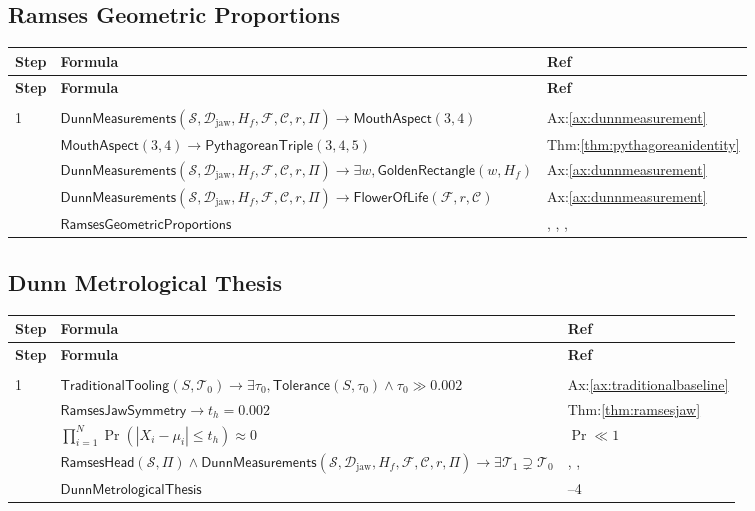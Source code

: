 \documentclass[12pt]{amsart}
\newcommand{\br}{,\allowbreak}
\newenvironment{prooftable}{%
	\renewcommand{\arraystretch}{1.2}%
	\setlength{\tabcolsep}{4pt}%
	\setlength{\arrayrulewidth}{0.05pt}
	\tiny
	\sloppy
	\begin{longtable}{
			|>{\centering\arraybackslash}m{0.7cm}|
			>{\raggedright\centering\arraybackslash}m{0.70\textwidth}|
			>{\centering\arraybackslash}m{3.5cm}|  %
		}%
		\hline
		\textbf{Step} & \centering\textbf{Formula} & \textbf{Ref} \\
		\hline
		\endfirsthead
		\hline
		\textbf{Step} & \centering\textbf{Formula} & \textbf{Ref} \\
		\hline
		\endhead
		\hline
		\multicolumn{3}{r}{\textit{Continued on next page}} \\
		\endfoot
		\hline
		\endlastfoot
	}{%
	\end{longtable}%
}
\begin{document}
\subsection{Ramses Geometric Proportions}
\begin{prooftable}
	1 & $\textsf{DunnMeasurements}(\mathcal{S} \br  \mathcal{D}_{\text{jaw}} \br  H_f \br  \mathcal{F} \br  \mathcal{C} \br  r \br  \Pi) \to \textsf{MouthAspect}(3 \br 4)$ & Ax:\ref{ax:dunnmeasurement} \\[3pt] \hline
	2 & $\textsf{MouthAspect}(3 \br 4) \to \textsf{PythagoreanTriple}(3 \br 4 \br 5)$ & Thm:\ref{thm:pythagoreanidentity} \\[3pt] \hline
	3 & $\textsf{DunnMeasurements}(\mathcal{S} \br  \mathcal{D}_{\text{jaw}} \br  H_f \br  \mathcal{F} \br  \mathcal{C} \br  r \br  \Pi) \to \exists w \br  \textsf{GoldenRectangle}(w \br  H_f)$ & Ax:\ref{ax:dunnmeasurement} \\[3pt] \hline
	4 & $\textsf{DunnMeasurements}(\mathcal{S} \br  \mathcal{D}_{\text{jaw}} \br  H_f \br  \mathcal{F} \br  \mathcal{C} \br  r \br  \Pi) \to \textsf{FlowerOfLife}(\mathcal{F} \br  r \br  \mathcal{C})$ & Ax:\ref{ax:dunnmeasurement} \\[3pt] \hdashline
	& $\textsf{RamsesGeometricProportions}$ & 1 \br 2 \br 3 \br 4
\end{prooftable}

\subsection{Dunn Metrological Thesis}
\begin{prooftable}
	1 & $\textsf{TraditionalTooling}(S \br  \mathcal{T}_0) \to \exists \tau_0 \br  \textsf{Tolerance}(S \br  \tau_0) \wedge \tau_0 \gg 0.002$ & Ax:\ref{ax:traditionalbaseline} \\[3pt] \hline
	2 & $\textsf{RamsesJawSymmetry} \to t_h = 0.002$ & Thm:\ref{thm:ramsesjaw} \\[3pt] \hline
	3 & $\prod_{i=1}^N \Pr(|X_i - \mu_i| \le t_h) \approx 0$ & $\Pr \ll 1$ \\[3pt] \hline
	4 & $\textsf{RamsesHead}(\mathcal{S} \br  \Pi) \wedge \textsf{DunnMeasurements}(\mathcal{S} \br  \mathcal{D}_{\text{jaw}} \br  H_f \br  \mathcal{F} \br  \mathcal{C} \br  r \br  \Pi) \to \exists \mathcal{T}_1 \supsetneq \mathcal{T}_0$ & 1 \br 2 \br 3 \\[3pt] \hdashline
	& $\textsf{DunnMetrologicalThesis}$ & 1--4
\end{prooftable}
\end{document}
